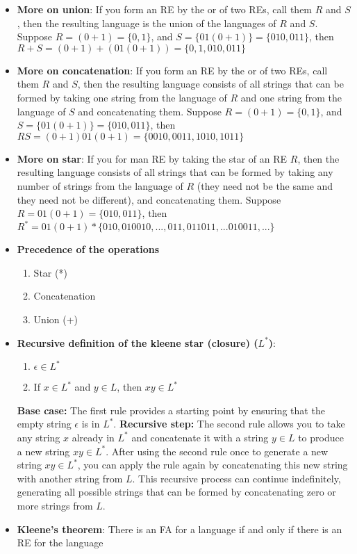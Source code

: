 \documentclass{report}
\begin{document}
\begin{itemize}
        \item \textbf{More on union}:
            If you form an RE by the or of two REs, call them $R$ and $S$, then the resulting language is the union of the languages of $R$ and $S$.
            \bigbreak \noindent 
            Suppose $R = (0+1) = \{0, 1\}$, and $S=\{01(0+1)\}  = \{ 010,011\}$, then $R+S = (0+1) + (01(0+1))  = \{0,1,010, 011\}$
        \item \textbf{More on concatenation}: If you form an RE by the or of two REs, call them $R$ and $S$, then the resulting language consists of all strings that can be formed by taking one string from the language of $R$ and one string from the language of $S$ and concatenating them.
            \bigbreak \noindent 
            Suppose $R = (0+1) = \{0, 1\}$, and $S=\{01(0+1)\}  = \{ 010,011\}$, then $RS = (0+1)01(0+1) = \{0010,0011,1010,1011\}$
        \item \textbf{More on star}: If you for man RE by taking the star of an RE $R$, then the resulting language consists of all strings that can be formed by taking any number of strings from the language of $R$ (they need not be the same and they need not be different), and concatenating them.
            \bigbreak \noindent 
            Suppose $R = 01(0+1) = \{010, 011\}$, then $R^{*} = 01(0+1)* \{010, 010010, ..., 011,011011,... 010011, ...\} $
    \item \textbf{Precedence of the operations}
        \begin{enumerate}
            \item Star (*)
            \item Concatenation
            \item Union (+)
        \end{enumerate}
        \item \textbf{Recursive definition of the kleene star (closure) ($L^{*}$)}:
            \begin{enumerate}
                \item $\epsilon \in L^{*} $
                \item If $x \in L^{*}$ and $y\in L$, then $xy \in L^{*}$
            \end{enumerate}
            \bigbreak \noindent 
            \textbf{Base case:} The first rule provides a starting point by ensuring that the empty string \( \epsilon \) is in \( L^* \).
            \bigbreak \noindent 
            \textbf{Recursive step:} The second rule allows you to take any string \( x \) already in \( L^* \) and concatenate it with a string \( y \in L \) to produce a new string \( xy \in L^* \).
            \bigbreak \noindent 
            After using the second rule once to generate a new string \( xy \in L^* \), you can apply the rule again by concatenating this new string with another string from \( L \). This recursive process can continue indefinitely, generating all possible strings that can be formed by concatenating zero or more strings from \( L \).

        \item \textbf{Kleene's theorem}:
            There is an FA for a language if and only if there is an RE for the language
    \end{itemize}
\end{document}
